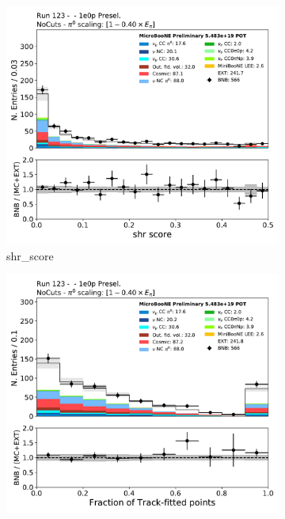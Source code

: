 \begin{figure}[H] 
\begin{center}
    \begin{subfigure}[b]{0.3\textwidth}
    \centering
    \includegraphics[width=1.00\textwidth]{1e0p/dataMCRun123/shr_score.pdf}
    \caption{\label{fig:1e0p:dataMCRun1:shr_score} shr\_score }
    \end{subfigure}
    \begin{subfigure}[b]{0.3\textwidth}
    \centering
    \includegraphics[width=1.00\textwidth]{1e0p/dataMCRun123/trkfit.pdf}

\end{subfigure}
\end{center}
\end{figure}
